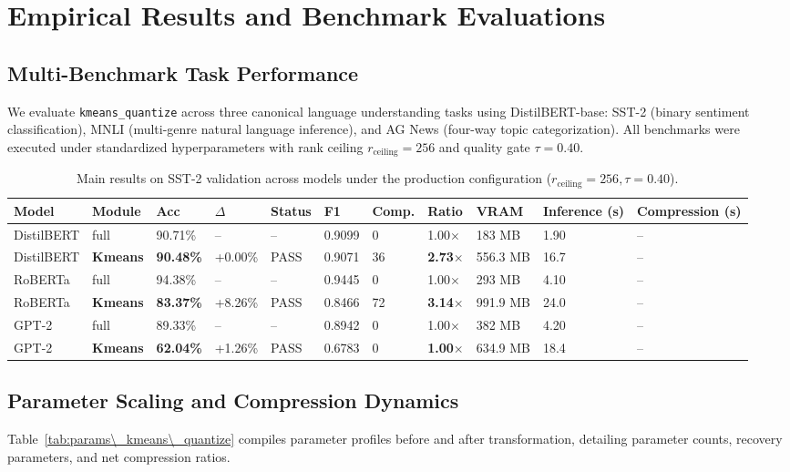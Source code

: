 \section{Empirical Results and Benchmark Evaluations}
\label{sec:results}

\subsection{Multi-Benchmark Task Performance}
We evaluate \texttt{kmeans\_quantize} across three canonical language understanding tasks using DistilBERT-base: SST-2 (binary sentiment classification), MNLI (multi-genre natural language inference), and AG News (four-way topic categorization). All benchmarks were executed under standardized hyperparameters with rank ceiling $r_{\mathrm{ceiling}} = 256$ and quality gate $\tau = 0.40$.

\begin{table}[t]
\centering
\small
\begin{tabular}{lllllllllll}
\toprule
\textbf{Model} & \textbf{Module} & \textbf{Acc} & \textbf{$\Delta$} & \textbf{Status} & \textbf{F1} & \textbf{Comp.} & \textbf{Ratio} & \textbf{VRAM} & \textbf{Inference (s)} & \textbf{Compression (s)} \\
\midrule
DistilBERT & full & 90.71\% & -- & -- & 0.9099 & 0 & 1.00$\times$ & 183 MB & 1.90 & -- \\
DistilBERT & \textbf{Kmeans} & \textbf{90.48\%} & +0.00\% & PASS & 0.9071 & 36 & \textbf{2.73$\times$} & 556.3 MB & 16.7 & -- \\
RoBERTa & full & 94.38\% & -- & -- & 0.9445 & 0 & 1.00$\times$ & 293 MB & 4.10 & -- \\
RoBERTa & \textbf{Kmeans} & \textbf{83.37\%} & +8.26\% & PASS & 0.8466 & 72 & \textbf{3.14$\times$} & 991.9 MB & 24.0 & -- \\
GPT-2 & full & 89.33\% & -- & -- & 0.8942 & 0 & 1.00$\times$ & 382 MB & 4.20 & -- \\
GPT-2 & \textbf{Kmeans} & \textbf{62.04\%} & +1.26\% & PASS & 0.6783 & 0 & \textbf{1.00$\times$} & 634.9 MB & 18.4 & -- \\
\bottomrule
\end{tabular}
\caption{Main results on SST-2 validation across models under the production configuration ($r_{\mathrm{ceiling}}=256, \tau=0.40$).}
\label{tab:main\_sst2}
\end{table}

\subsection{Parameter Scaling and Compression Dynamics}
Table~\ref{tab:params\_kmeans\_quantize} compiles parameter profiles before and after transformation, detailing parameter counts, recovery parameters, and net compression ratios.

